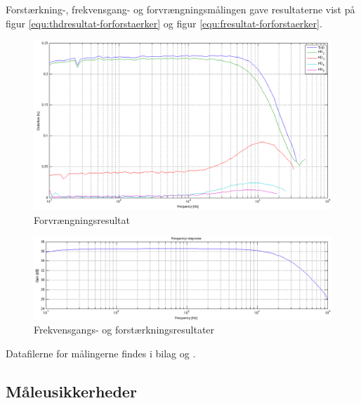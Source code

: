Forstærkning-, frekvensgang- og forvrængningsmålingen gave resultaterne vist på figur \ref{equ:thdresultat-forforstaerker} og figur \ref{equ:fresultat-forforstaerker}.

\begin{figure}[h]
\centering
\includegraphics[width=\textwidth]{maalerapporter/forforstaerker/thd-forforstaerker.png}
\caption{Forvrængningsresultat}
\label{fig:thdresultat-forforstaerker}
\end{figure}

\begin{figure}[h]
\centering
\includegraphics[width=\textwidth]{maalerapporter/forforstaerker/frekvensrespons-forforstaerker.png}
\caption{Frekvensgangs- og forstærkningsresultater}
\label{fig:fresultat-forforstaerker}
\end{figure}

Datafilerne for målingerne findes i bilag  og .

\subsection*{Måleusikkerheder}

%